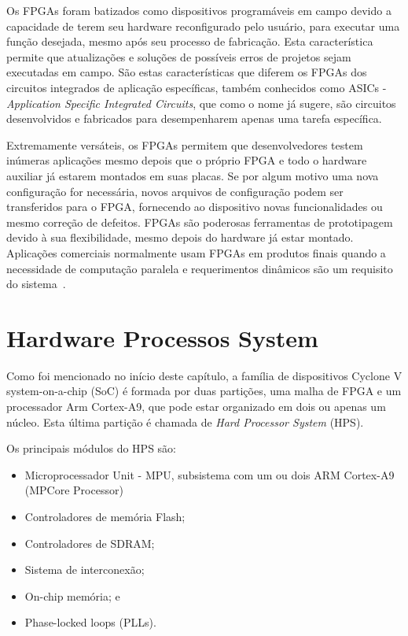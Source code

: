 Os FPGAs foram batizados como dispositivos programáveis em campo devido a capacidade de terem seu hardware reconfigurado pelo usuário, para executar uma função desejada, mesmo após seu processo de fabricação. Esta característica permite que atualizações e soluções de possíveis erros de projetos sejam executadas em campo. São estas características que diferem os FPGAs dos circuitos integrados de aplicação específicas, também conhecidos como ASICs - \textit{Application Specific Integrated Circuits}, que como o nome já sugere, são circuitos desenvolvidos e fabricados para desempenharem apenas uma tarefa específica.

Extremamente versáteis, os FPGAs permitem que desenvolvedores testem inúmeras aplicações mesmo depois que o próprio FPGA e todo o hardware auxiliar já estarem montados em suas placas. Se por algum motivo uma nova configuração for necessária, novos arquivos de configuração podem ser transferidos para o FPGA, fornecendo ao dispositivo novas funcionalidades ou mesmo correção de defeitos. FPGAs são poderosas ferramentas de prototipagem devido à sua flexibilidade, mesmo depois do hardware já estar montado. Aplicações comerciais normalmente usam FPGAs em produtos finais quando a necessidade de computação paralela e requerimentos dinâmicos são um requisito do sistema~\cite{FPGAarm}.



\section{Hardware Processos System}
Como foi mencionado no início deste capítulo, a família de dispositivos Cyclone V system-on-a-chip (SoC) é formada por duas partições, uma malha de FPGA e um processador Arm Cortex-A9, que pode estar organizado em dois ou apenas um núcleo. Esta última partição é chamada de \textit{Hard Processor System} (HPS). 

Os principais módulos do HPS são:

\begin{itemize}
    \item Microprocessador Unit - MPU, subsistema com um ou dois ARM Cortex-A9 (MPCore Processor)
    \item Controladores de memória Flash;
    \item Controladores de SDRAM;
    \item Sistema de interconexão;
    \item On-chip memória; e
    \item Phase-locked loops (PLLs).
\end{itemize}


